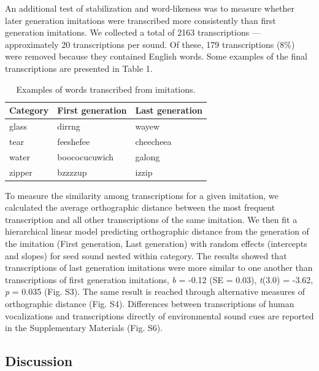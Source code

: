 \documentclass[english,floatsintext,man]{apa6}
\theoremstyle{definition}
\theoremstyle{definition}
\theoremstyle{definition}
\theoremstyle{remark}
\begin{document}
An additional test of stabilization and word-likeness was to measure
whether later generation imitations were transcribed more consistently
than first generation imitations. We collected a total of 2163
transcriptions --- approximately 20 transcriptions per sound. Of these,
179 transcriptions (8\%) were removed because they contained English
words. Some examples of the final transcriptions are presented in Table
1.

\begin{table}

\caption{\label{tab:table1}Examples of words transcribed from imitations.}
\centering
\begin{tabular}[t]{l|l|l}
\hline
Category & First generation & Last generation\\
\hline
glass & dirrng & wayew\\
\hline
tear & feeshefee & cheecheea\\
\hline
water & boococucuwich & galong\\
\hline
zipper & bzzzzup & izzip\\
\hline
\end{tabular}
\end{table}

To measure the similarity among transcriptions for a given imitation, we
calculated the average orthographic distance between the most frequent
transcription and all other transcriptions of the same imitation. We
then fit a hierarchical linear model predicting orthographic distance
from the generation of the imitation (First generation, Last generation)
with random effects (intercepts and slopes) for seed sound nested within
category. The results showed that transcriptions of last generation
imitations were more similar to one another than transcriptions of first
generation imitations, \emph{b} = -0.12 (SE = 0.03), \emph{t}(3.0) =
-3.62, \emph{p} = 0.035 (Fig. S3). The same result is reached through
alternative measures of orthographic distance (Fig. S4). Differences
between transcriptions of human vocalizations and transcriptions
directly of environmental sound cues are reported in the Supplementary
Materials (Fig. S6).

\hypertarget{discussion}{%
\subsection{Discussion}\label{discussion}}
\end{document}
